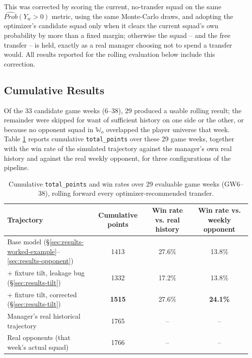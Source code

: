 				This was corrected by scoring the current, no-transfer squad on the same $\widehat{Prob}(Y_w>0)$ metric, using the same Monte-Carlo draws, and adopting the optimizer's candidate squad only when it clears the current squad's own probability by more than a fixed margin; otherwise the squad -- and the free transfer -- is held, exactly as a real manager choosing not to spend a transfer would. All results reported for the rolling evaluation below include this correction.

			\subsection{Cumulative Results}
				Of the 33 candidate game weeks (6--38), 29 produced a usable rolling result; the remainder were skipped for want of sufficient history on one side or the other, or because no opponent squad in $\mathbb{W}_o$ overlapped the player universe that week. Table \ref{tab:rolling-results} reports cumulative \texttt{total\_points} over these 29 game weeks, together with the win rate of the simulated trajectory against the manager's own real history and against the real weekly opponent, for three configurations of the pipeline.

				\begin{table}[H]
					\begin{center}
						\begin{tabular}{|l|c|c|c|}
							\hline
							Trajectory & Cumulative points & Win rate vs. real history & Win rate vs. weekly opponent \\
							\hline
							Base model (\S\ref{sec:results-worked-example}--\ref{sec:results-opponent}) & 1413 & 27.6\% & 13.8\% \\
							\hline
							+ fixture tilt, leakage bug (\S\ref{sec:results-tilt}) & 1332 & 17.2\% & 13.8\% \\
							\hline
							+ fixture tilt, corrected (\S\ref{sec:results-tilt}) & \textbf{1515} & 27.6\% & \textbf{24.1\%} \\
							\hline
							\hline
							Manager's real historical trajectory & 1765 & -- & -- \\
							\hline
							Real opponents (that week's actual squad) & 1766 & -- & -- \\
							\hline
						\end{tabular}
					\end{center}
					\caption{Cumulative \texttt{total\_points} and win rates over 29 evaluable game weeks (GW6--38), rolling forward every optimizer-recommended transfer.}
					\label{tab:rolling-results}
				\end{table}

